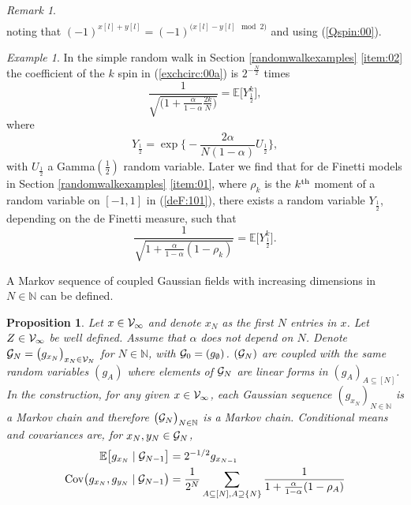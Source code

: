 \documentclass[preprint,11pt]{elsarticle}
\newtheorem{Proposition}{Proposition}
\theoremstyle{remark}
\newtheorem{Example}{Example}
\newtheorem{Remark}{Remark}
\begin{document}
{\begin{Remark}
\begin{align}
\nonumber
\end{align}
noting that  $(-1)^{x[l]+y[l]} = (-1)^{\big (x[l]-y[l] \mod 2 \big )}$ and using (\ref{Qspin:00}).
%
\end{Remark}
%
\begin{Example}\label{secondex:00}
In the simple random walk in Section \ref{randomwalkexamples} \ref{item:02} the coefficient of the $k$ spin in (\ref{exchcirc:00a}) is $2^{-\frac{N}{2}}$ times
\begin{equation*}
\frac{1}{\sqrt{
\Big (1 + \frac{\alpha}{1-\alpha}\frac{2k}{N}\Big )
}
}
= \mathbb{E}\big [Y_{\frac{1}{2}}^k\big ],
\label{coeft:99}
\end{equation*}
where
\[
Y_{\frac{1}{2}} = \exp \Big \{-\frac{2\alpha}{N(1-\alpha)} U_{\frac{1}{2}} \Big \},
\]
with $U_{\frac{1}{2}}$ a Gamma$(\frac{1}{2})$ random variable.
Later we find that for de Finetti models in Section \ref{randomwalkexamples} \ref{item:01}, where $\rho_k$  is the $k^\text{\rm th}$ moment of a random variable on $[-1,1]$ in (\ref{deF:101}), there exists a random variable $Y_{\frac{1}{2}}$, depending on the de Finetti measure, such that
\[
 \frac {1}{\sqrt{1 + \frac{\alpha}{1-\alpha}(1-\rho_k)}}=
 \mathbb{E}\big [Y_{\frac{1}{2}}^k\big ].
\]
\end{Example}
A Markov sequence of coupled Gaussian fields 
with increasing dimensions in $N \in \mathbb{N}$ can be defined. 
\begin{Proposition}\label{Markov:000}
Let $x \in {\cal V}_\infty$ and denote $x_N$ as the first $N$ entries in $x$.
Let $Z \in {\cal V}_\infty$ be well defined. Assume that $\alpha$ does not depend on $N$.
Denote ${\cal G}_N = \big (g_{x_N}\big )_{x_N \in {\cal V}_N}$ for $N\in \mathbb{N}$, with
${\cal G}_0 = (g_\emptyset)$. $({\cal G}_N)$ are coupled with the same random variables $(g_A)$ where elements of ${\cal G}_N$ are linear forms in $(g_A)_{A\subseteq [N]}$.
In the construction, for any given $x \in {\cal V}_\infty$,
each Gaussian sequence $(g_{x_N})_{N\in \mathbb{N}}$ is a Markov chain and therefore $\big ({\cal G}_N\big )_{N\in \mathbb{N}}$ is a Markov chain.
%
Conditional means and covariances are, for $x_N,y_N \in {\cal G}_N$,
\begin{align}
\mathbb{E}\big [g_{{ x}_N}\mid {\cal G}_{N-1}\big ] &= 2^{-1/2}g_{x_{N-1}}\nonumber\\
\text{\rm Cov}\big (g_{{x}_N}, g_{{y}_N}\mid {\cal G}_{N-1}\big )
& = \frac{1}{2^N}\sum_{A\subseteq [N], A \supseteq \{N\}} \frac{1}{1 + \frac{\alpha}{1-\alpha}(1-\rho_A)}

\end{align}
\end{Proposition}}
\end{document}
